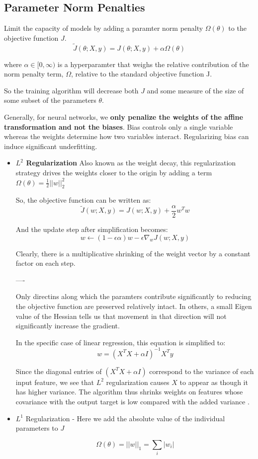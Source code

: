 \documentclass{article}
\theoremstyle{definition}
\begin{document}
\subsection{Parameter Norm Penalties}

Limit the capacity of models by adding a paramter norm penalty $\Omega(\theta)$ to the objective function $J$. 
$$ \tilde{J}(\theta; X, y) = J( \theta; X, y) + \alpha\Omega(\theta) $$

where $ \alpha \in [0, \infty) $ is a hyperparamter that weighs the relative contribution of the norm penalty term, $\Omega$, relative to the standard objective function J.

So the training algorithm will decrease both $J$ and some measure of the size of some subset of the parameters $ \theta$.

Generally, for neural networks, we \textbf{only penalize the weights of the affine transformation and not the biases}. Bias controls only a single variable whereas the weights determine how two variables interact. Regularizing bias can induce significant underfitting.

\begin{itemize}
    \item \textbf{$L^2$ Regularization} Also known as the weight decay, this regularization strategy drives the weights closer to the origin by adding a term $ \Omega(\theta) = \frac{1}{2} || w ||^2_2$
    
    So, the objective function can be written as:
    $$ \tilde{J}(w; X, y) = J(w; X, y) + \frac{\alpha}{2}w^Tw $$
    
    And the update step after simplification becomes:
    $$ w \leftarrow (1 - \epsilon\alpha)w - \epsilon \nabla_wJ(w; X,y) $$
    
    Clearly, there is a multiplicative shrinking of the weight vector by a constant factor on each step.
    
    ----
    
    Only directins along which the paramters contribute significantly to reducing the objective function are preserved relatively intact. In others, a small Eigen value of the Hessian tells us that movement in that direction will not significantly increase the gradient.
    
    In the specific case of linear regression, this equation is simplified to:
    $$ w = (X^TX + \alpha I) ^{-1} X^T y $$
    
    Since the diagonal entries of $ (X^TX + \alpha I)$ correspond to the variance of each input feature, we see that $L^2$ regularization causes $X$ to appear as though it has higher variance. The algorithm thus shrinks weights on features whose covariance with the output target is low compared with the added variance .
    
    \item{$L^1$ Regularization} - Here we add the absolute value of the individual parameters to $J$
    
    $$ \Omega(\theta) = ||w||_1 = \sum_i|w_i| $$
    
\end{itemize}
\end{document}
